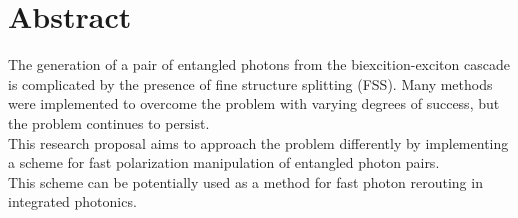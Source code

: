 \chapter*{Abstract}
The generation of a pair of entangled photons from the biexcition-exciton cascade is complicated by the presence of fine structure splitting (FSS). Many methods were implemented to overcome the problem with varying degrees of success, but the problem continues to persist.  \\
This research proposal aims to approach the problem differently by implementing a scheme for fast polarization manipulation of entangled photon pairs.\\
This scheme can be potentially used as a method for fast photon rerouting in integrated photonics.   



